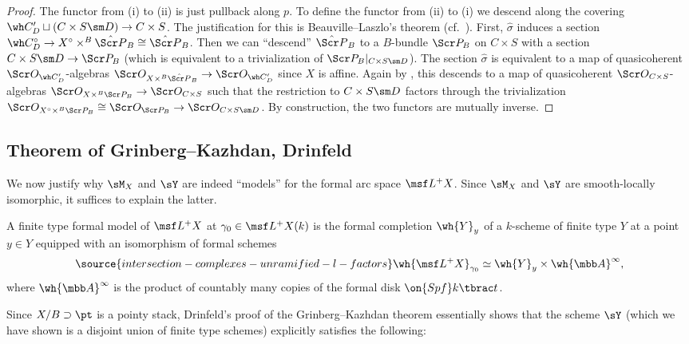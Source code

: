 \begin{proof}
The functor from (i) to (ii) is just pullback along $p$.
To define the functor from (ii) to (i) we descend along the covering
$\wh C'_D \sqcup (C\times S \sm D) \to C\times S$. The justification
for this is Beauville--Laszlo's theorem (cf.~\cite[Theorem 2.12.1]{BD}).
First, $\hat \sigma$ induces
a section $\wh C^\circ_D \to X^\circ \times^B \hat{\Scr P}_B \cong \hat{\Scr P}_B$.
Then we can ``descend'' $\hat{\Scr P}_B$ to a $B$-bundle $\Scr P_B$ on $C\times S$ with a section $C\times S\sm D \to \Scr P_B$ (which
is equivalent to a trivialization of $\Scr P_B|_{C\times S\sm D}$).
The section $\hat\sigma$ is equivalent to a map of quasicoherent
$\Scr O_{\wh C'_D}$-algebras $\Scr O_{X\times^B \hat{\Scr P}_B} \to \Scr O_{\wh C'_D}$ since $X$ is affine.
Again by \cite[Theorem 2.12.1]{BD}, this descends
to a map of quasicoherent $\Scr O_{C\times S}$-algebras $\Scr O_{X\times^B \Scr P_B} \to \Scr O_{C\times S}$ such that the restriction to
$C\times S\sm D$ factors through the trivialization
$\Scr O_{X^\circ \times^B \Scr P_B}\cong \Scr O_{\Scr P_B} \to \Scr O_{C\times S\sm D}$.
By construction, the two functors are mutually inverse.
\end{proof}


\subsection{Theorem of Grinberg--Kazhdan, Drinfeld}

We now justify why $\sM_X$ and $\sY$ are indeed ``models'' for the formal arc space
$\msf L^+ X$. Since $\sM_X$ and $\sY$ are smooth-locally isomorphic,
it suffices to explain the latter.

\begin{defn}
\notready\label{def:formalmodel}
A finite type formal model of $\msf L^+ X$ at $\gamma_0\in \msf L^+ X(k)$ is the formal completion $\wh{Y}_y$ of a $k$-scheme of finite type $Y$ at a point $y\in Y$ equipped with an isomorphism of formal schemes
\begin{equation} \label{finite model}
\source{intersection-complexes-unramified-l-factors}
\wh{\msf L^+ X}_{\gamma_0} \simeq \wh{Y}_y \times \wh{\mbb A}^\infty,
\end{equation}
where $\wh{\mbb A}^\infty$ is the product of countably many copies of the formal disk $\on{Spf} k\tbrac t$.
\end{defn}


Since $X/B \supset \pt$ is a pointy stack,
Drinfeld's proof \cite[\S 4.2-4.3]{Drinfeld} of the Grinberg--Kazhdan theorem
essentially shows that the scheme $\sY$ (which we have shown is a disjoint union
of finite type schemes) explicitly satisfies the following:

